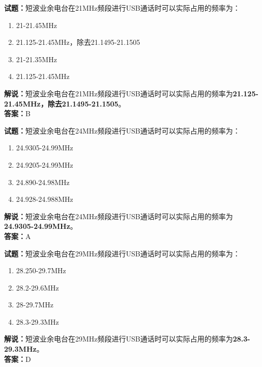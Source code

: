 \documentclass{ctexbook}
\begin{document}
\vspace{\baselineskip}

\noindent\textbf{试题：}短波业余电台在21\unit{\MHz}频段进行USB通话时可以实际占用的频率为：
\begin{enumerate}[leftmargin=3em]
  \item 21-21.45\unit{\MHz}
  \item 21.125-21.45\unit{\MHz}，除去21.1495-21.1505
  \item 21-21.35\unit{\MHz}
  \item 21.125-21.45\unit{\MHz}
\end{enumerate}
\noindent\textbf{解说：}短波业余电台在21\unit{\MHz}频段进行USB通话时可以实际占用的频率为\textbf{21.125-21.45\unit{\MHz}，除去21.1495-21.1505}。\\\noindent\textbf{答案：}B

\vspace{\baselineskip}

\noindent\textbf{试题：}短波业余电台在24\unit{\MHz}频段进行USB通话时可以实际占用的频率为：
\begin{enumerate}[leftmargin=3em]
  \item 24.9305-24.99\unit{\MHz}
  \item 24.9205-24.99\unit{\MHz}
  \item 24.890-24.98\unit{\MHz}
  \item 24.928-24.988\unit{\MHz}
\end{enumerate}
\noindent\textbf{解说：}短波业余电台在24\unit{\MHz}频段进行USB通话时可以实际占用的频率为\textbf{24.9305-24.99\unit{\MHz}}。\\\noindent\textbf{答案：}A

\vspace{\baselineskip}

\noindent\textbf{试题：}短波业余电台在29\unit{\MHz}频段进行USB通话时可以实际占用的频率为：
\begin{enumerate}[leftmargin=3em]
  \item 28.250-29.7\unit{\MHz}
  \item 28.2-29.6\unit{\MHz}
  \item 28-29.7\unit{\MHz}
  \item 28.3-29.3\unit{\MHz}
\end{enumerate}
\noindent\textbf{解说：}短波业余电台在29\unit{\MHz}频段进行USB通话时可以实际占用的频率为\textbf{28.3-29.3\unit{\MHz}}。\\\noindent\textbf{答案：}D

\vspace{\baselineskip}
\end{document}

